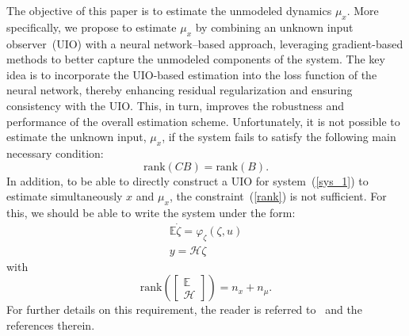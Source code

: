 \documentclass{ifacconf}
\def\eqref#1{(\ref{#1})}
\begin{document}
The objective of this paper is to estimate the unmodeled dynamics $\mu_{x}$. More specifically, we propose to estimate $\mu_{x}$ by combining an unknown input observer~(UIO) with a neural network--based approach, leveraging gradient-based methods to better capture the unmodeled components of the system. The key idea is to incorporate the UIO-based estimation into the loss function of the neural network, thereby enhancing residual regularization and ensuring consistency with the UIO. This, in turn, improves the robustness and performance of the overall estimation scheme. Unfortunately, it is not possible to estimate the unknown input, $\mu_x$, if the system fails to satisfy the following main necessary condition:
\begin{equation}\label{rank}
\textrm{rank}(C B) = \textrm{rank}(B).
\end{equation}
%
In addition, to be able to directly construct a UIO for system~\eqref{sys_1} to estimate simultaneously $x$ and $\mu_x$, the constraint~\eqref{rank} is not sufficient. For this, we should be able to write the system under the form:
\begin{equation}\label{sys_2}
    \begin{array}{l}
        \mathbb{E} \dot{\zeta} = \varphi_{\zeta}(\zeta,u)  \\
        y = \mathcal{H} \zeta
    \end{array}
\end{equation}
with
\begin{equation}\label{rank2}
\textrm{rank}\left( \begin{bmatrix} \mathbb{E} \\  \mathcal{H} \end{bmatrix} \right) = n_{x} + n_{\mu}.
\end{equation}
For further details on this requirement, the reader is referred to~\cite{chaouche2022unknown,trinh2011functional,Zemouche-Boutayeb-2009,Hassan13a,Trinh:TAC08} and the references therein. 


\end{document}
